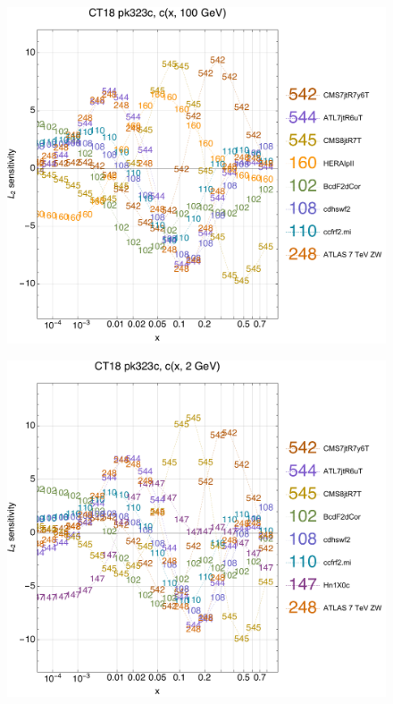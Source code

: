 \documentclass[10pt,aps,prd,floatfix,titlepage]{revtex4}
\begin{document}
\clearpage
\begin{figure}
\includegraphics[width=\textwidth,height=0.44\textheight,keepaspectratio]{1/ifl4_ct18nn_L2_q100_Sf_1.pdf}
\caption{}
\end{figure}
\begin{figure}
\includegraphics[width=\textwidth,height=0.44\textheight,keepaspectratio]{1/ifl4_ct18nn_L2_q2_Sf_1.pdf}
\caption{}
\end{figure}
\end{document}
